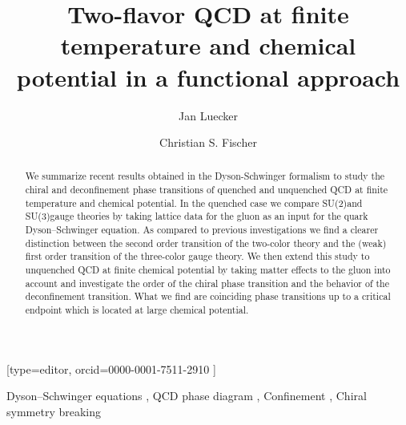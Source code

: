 \documentclass[a4paper,fleqn]{cls/cas-dc}
\begin{document}
\let\WriteBookmarks\relax
\def\floatpagepagefraction{1}
\def\textpagefraction{.001}

\title [mode = title]{Two-flavor QCD at finite temperature and chemical potential in a functional approach}                      


\author[1]{Jan Luecker}[type=editor,
                        orcid=0000-0001-7511-2910 ]
\cormark[1]

\address[1]{Institut f{\"u}r Theoretische Physik, Justus-Liebig-Universit{\"a}t Gie{\ss}en, Heinrich-Buff-Ring 16, D-35392 Gie{\ss}en, Germany}

\author[1,2]{Christian S. Fischer}

\address[2]{GSI Helmholtzzentrum f{\"u}r Schwerionenforschung GmbH, Planckstr., 1 D-64291 Darmstadt, Germany}


\begin{abstract}
We summarize recent results obtained in the Dyson-Schwinger formalism to study
the chiral and deconfinement phase transitions of quenched and unquenched QCD at
finite temperature and chemical potential. In the quenched case we compare SU(2)and
SU(3)gauge theories by taking lattice data for the gluon as an input for the quark
Dyson–Schwinger equation. As compared to previous investigations we find a clearer
distinction between the second order transition of the two-color theory and the (weak) first
order transition of the three-color gauge theory. We then extend this study to unquenched
QCD at finite chemical potential by taking matter effects to the gluon into account and
investigate the order of the chiral phase transition and the behavior of the deconfinement
transition. What we find are coinciding phase transitions up to a critical endpoint which is
located at large chemical potential.

\end{abstract}

\begin{keywords}
Dyson–Schwinger equations \sep 
QCD phase diagram \sep 
Confinement \sep 
Chiral symmetry breaking
\end{keywords}


\maketitle
\end{document}
